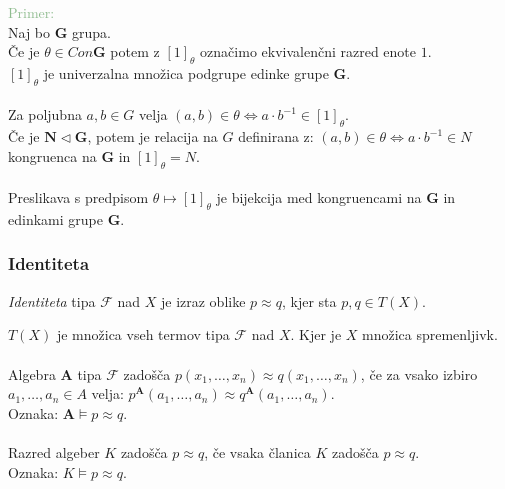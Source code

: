 \documentclass{beamer}
\begin{document}
\begin{frame}
    \textcolor{darkseagreen}{Primer:}\\
Naj bo $\mathbf{G}$ grupa. \\
Če je $\theta \in Con \mathbf{G}$ potem z $\left[1\right]_\theta$ označimo ekvivalenčni razred enote $1$.\\
$\left[1\right]_\theta$ je univerzalna množica podgrupe edinke grupe $\mathbf{G}$. \\~\\ 
Za poljubna $a, b \in G$ velja $\left(a, b\right) \in \theta \Leftrightarrow a \cdot b^{-1} \in \left[1\right]_\theta$.\\
Če je $\mathbf{N} \vartriangleleft \mathbf{G}$, potem je relacija na $G$ definirana z:
$\left(a,b\right) \in \theta \Leftrightarrow a \cdot b^{-1} \in N$ kongruenca na $\mathbf{G}$ in $\left[1\right]_\theta= N$.\\~\\
Preslikava s predpisom $\theta \mapsto \left[1\right]_\theta$ je bijekcija med kongruencami na $\mathbf{G}$ in edinkami grupe $\mathbf{G}$.\\
\end{frame}
\begin{frame}
\frametitle{Identiteta}
    \begin{block}{}
        \emph{Identiteta} tipa $\mathcal{F}$ nad $X$ je izraz oblike $p\approx q$, kjer sta $p, q \in T\left(X\right)$. 
    \end{block}
    $T\left(X\right)$ je množica vseh termov tipa $\mathcal{F}$ nad $X$. Kjer je $X$ množica spremenljivk.\\~\\
    Algebra $\mathbf{A}$ tipa $\mathcal{F}$ zadošča $p\left(x_1, \ldots, x_n\right)\approx q\left(x_1, \ldots, x_n\right)$,
    če za vsako izbiro $a_1, \ldots, a_n \in A$ velja: $p^\mathbf{A}\left(a_1, \ldots, a_n\right) \approx q^\mathbf{A}\left(a_1, \ldots, a_n\right)$.\\
    Oznaka: $\mathbf{A} \models p\approx q$.\\~\\
    Razred algeber $K$ zadošča $p\approx q$, če vsaka članica $K$ zadošča $p\approx q$. \\
    Oznaka: $K \models p\approx q$.
\end{frame}
\end{document}
